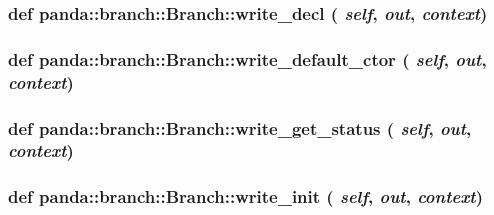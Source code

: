\label{classpanda_1_1branch_1_1Branch_a4c286519caece422014891fdc5135c34}
\hypertarget{classpanda_1_1branch_1_1Branch_a25d82deb9cd13e96ee61c094d8c23992}{
\subsubsection[{write\_\-decl}]{\setlength{\rightskip}{0pt plus 5cm}def panda::branch::Branch::write\_\-decl ( {\em self}, \/   {\em out}, \/   {\em context})}}
\label{classpanda_1_1branch_1_1Branch_a25d82deb9cd13e96ee61c094d8c23992}
\hypertarget{classpanda_1_1branch_1_1Branch_ad4467f85647bbd2fcb9f7f7e45dbb1e5}{
\subsubsection[{write\_\-default\_\-ctor}]{\setlength{\rightskip}{0pt plus 5cm}def panda::branch::Branch::write\_\-default\_\-ctor ( {\em self}, \/   {\em out}, \/   {\em context})}}
\label{classpanda_1_1branch_1_1Branch_ad4467f85647bbd2fcb9f7f7e45dbb1e5}
\hypertarget{classpanda_1_1branch_1_1Branch_ae54e0358ee4028d5875de8fd6435bb4e}{
\subsubsection[{write\_\-get\_\-status}]{\setlength{\rightskip}{0pt plus 5cm}def panda::branch::Branch::write\_\-get\_\-status ( {\em self}, \/   {\em out}, \/   {\em context})}}
\label{classpanda_1_1branch_1_1Branch_ae54e0358ee4028d5875de8fd6435bb4e}
\hypertarget{classpanda_1_1branch_1_1Branch_a84762a0e9ebcac10bd421a1f1ab5edb1}{
\subsubsection[{write\_\-init}]{\setlength{\rightskip}{0pt plus 5cm}def panda::branch::Branch::write\_\-init ( {\em self}, \/   {\em out}, \/   {\em context})}}
